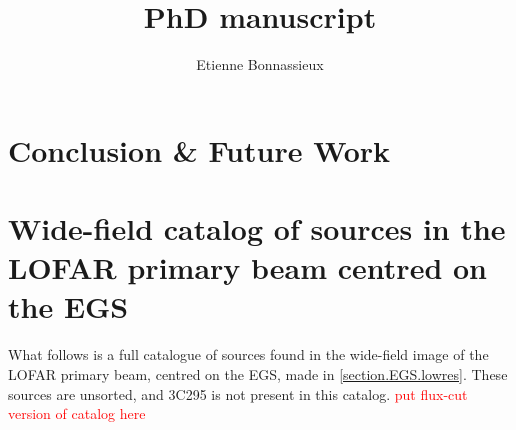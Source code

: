 \documentclass[11pt,a4paper,notitlepage]{book}
\author{Etienne Bonnassieux}
\title{PhD manuscript}
\makeatletter
\def\cleardoublepage{\clearpage\if@twoside \ifodd\c@page\else%
  \hbox{}%
  \thispagestyle{empty}%
  \newpage%
  \if@twocolumn\hbox{}\newpage\fi\fi\fi}
\makeatother
\begin{document}
\dominitoc
%

\maketitle
{}
%
%

\tableofcontents
\setcounter{page}{1}

 
\cleardoublepage



\cleardoublepage



\cleardoublepage



\cleardoublepage



\cleardoublepage



\cleardoublepage



\cleardoublepage




\cleardoublepage


\chapter{Conclusion \& Future Work}
\cleardoublepage
\minitoc



\cleardoublepage



\appendix
\chapter{Wide-field catalog of sources in the LOFAR primary beam centred on the EGS}\label{appendix.widefield.catalog}

\pg
What follows is a full catalogue of sources found in the wide-field image of the LOFAR primary beam, centred on the EGS, made in \cref{section.EGS.lowres}. These sources are unsorted, and 3C295 is not present in this catalog.
\textcolor{red}{put flux-cut version of catalog here}
%
\end{document}
